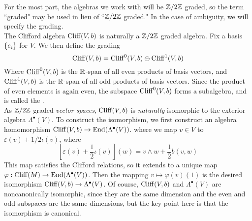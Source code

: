 %
For the most part, the algebras we work with will be $\mathbb{Z}/2\mathbb{Z}$ graded, so
the term ``graded" may be used in lieu of ``$\mathbb{Z}/2\mathbb{Z}$ graded." In the case of
ambiguity, we will specify the grading. \\
The Clifford algebra $\operatorname{Cliff}(V,b)$ is naturally a $\mathbb{Z}/2\mathbb{Z}$ graded algebra. Fix
a basis $\left\lbrace e_i \right\rbrace$ for $V$. We then define the grading
\[
\operatorname{Cliff}(V,b) = \operatorname{Cliff}^0(V,b) \oplus \operatorname{Cliff}^1(V,b)
\]
Where $\operatorname{Cliff}^0(V,b)$ is the $\mathbb{R}$-span of all even products of basis vectors,
and $\operatorname{Cliff}^1(V,b)$ is the $\mathbb{R}$-span of all odd products of basis vectors.
Since the product of even elements is again even, the subspace
$\operatorname{Cliff}^0(V,b)$ forms a subalgebra, and is called the . \\

As $\mathbb{Z}/2\mathbb{Z}$-graded \emph{vector spaces}, $\operatorname{Cliff}(V,b)$ is \emph{naturally}
isomorphic to the exterior algebra $\Lambda^\bullet(V)$. To construct the isomorphism,
we first construct an algebra homomorphism $\operatorname{Cliff}(V,b) \to \operatorname{End}(\Lambda^\bullet(V))$.
where we map $v \in V$
to $\varepsilon(v) + 1/2 \iota(v)$, where
\[
[\varepsilon(v) +\frac{1}{2}\iota(v)](w) = v \wedge w + \frac{1}{2}b(v,w)
\]
This map satisfies the Clifford relations, so it extends to a unique map
$\varphi : \operatorname{Cliff}(M) \to \operatorname{End}(\Lambda^\bullet(V))$. Then the mapping
$v \mapsto \varphi(v)(1)$ is the desired isomorphism
$\operatorname{Cliff}(V,b) \to \Lambda^\bullet(V)$. Of course, $\operatorname{Cliff}(V,b)$ and
$\Lambda^\bullet(V)$ are noncanonically isomorphic, since they are the same dimension
and the even and odd subspaces are the same dimensions, but the key point here is that
the isomorphism is canonical. \\
%

